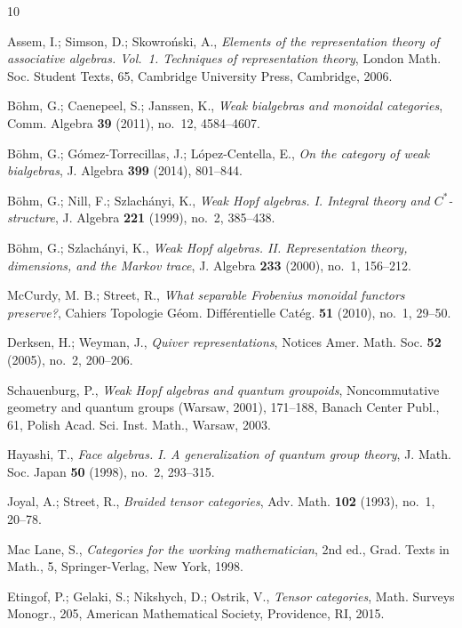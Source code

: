 \documentclass{amsart}
\theoremstyle{definition}
\theoremstyle{remark}
\numberwithin{equation}{section}
\begin{document}
\begin{thebibliography}{10}

Assem, I.; Simson, D.; Skowro\'nski, A., \emph{Elements of the representation
  theory of associative algebras. Vol.~1. Techniques of representation theory},
  London Math. Soc. Student Texts, 65, Cambridge University Press, Cambridge,
  2006.

B\"ohm, G.; Caenepeel, S.; Janssen, K., \emph{Weak bialgebras and monoidal
  categories}, Comm. Algebra \textbf{39} (2011), no.~12, 4584--4607.

B\"ohm, G.; G\'omez-Torrecillas, J.; L\'opez-Centella, E., \emph{On the
  category of weak bialgebras}, J. Algebra \textbf{399} (2014), 801--844.

B\"ohm, G.; Nill, F.; Szlach\'anyi, K., \emph{Weak Hopf algebras. I. Integral
  theory and {$C^*$}-structure}, J. Algebra \textbf{221} (1999), no.~2,
  385--438.

B\"ohm, G.; Szlach\'anyi, K., \emph{Weak Hopf algebras. II. Representation
  theory, dimensions, and the Markov trace}, J. Algebra \textbf{233} (2000),
  no.~1, 156--212.

McCurdy, M. B.; Street, R., \emph{What separable Frobenius monoidal functors
  preserve?}, Cahiers Topologie G\'eom. Diff\'erentielle Cat\'eg. \textbf{51}
  (2010), no.~1, 29--50.

Derksen, H.; Weyman, J., \emph{Quiver representations}, Notices Amer. Math.
  Soc. \textbf{52} (2005), no.~2, 200--206.

Schauenburg, P., \emph{Weak Hopf algebras and quantum groupoids},
  Noncommutative geometry and quantum groups (Warsaw, 2001), 171--188, Banach
  Center Publ., 61, Polish Acad. Sci. Inst. Math., Warsaw, 2003.

Hayashi, T., \emph{Face algebras. I. A generalization of quantum group theory},
  J. Math. Soc. Japan \textbf{50} (1998), no.~2, 293--315.

Joyal, A.; Street, R., \emph{Braided tensor categories}, Adv. Math.
  \textbf{102} (1993), no.~1, 20--78.

Mac Lane, S., \emph{Categories for the working mathematician}, 2nd ed., Grad.
  Texts in Math., 5, Springer-Verlag, New York, 1998.

Etingof, P.; Gelaki, S.; Nikshych, D.; Ostrik, V., \emph{Tensor categories},
  Math. Surveys Monogr., 205, American Mathematical Society, Providence, RI,
  2015.


\end{thebibliography}
\end{document}
